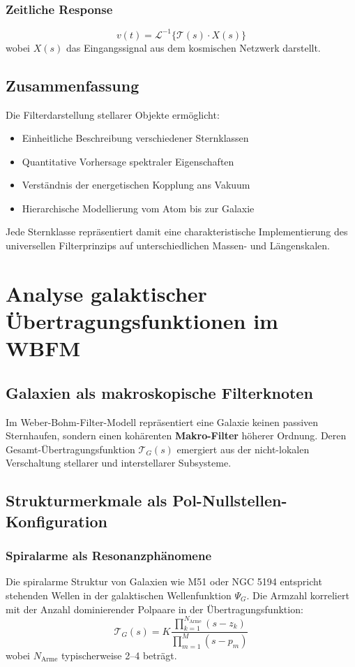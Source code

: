 \subsection{Zeitliche Response}
\[
v(t) = \mathcal{L}^{-1}\{\mathcal{T}(s)\cdot X(s)\}
\]
wobei $X(s)$ das Eingangssignal aus dem kosmischen Netzwerk darstellt.

\section{Zusammenfassung}

Die Filterdarstellung stellarer Objekte ermöglicht:
\begin{itemize}
\item Einheitliche Beschreibung verschiedener Sternklassen
\item Quantitative Vorhersage spektraler Eigenschaften
\item Verständnis der energetischen Kopplung ans Vakuum
\item Hierarchische Modellierung vom Atom bis zur Galaxie
\end{itemize}

Jede Sternklasse repräsentiert damit eine charakteristische Implementierung des universellen Filterprinzips auf unterschiedlichen Massen- und Längenskalen.

\chapter{Analyse galaktischer Übertragungsfunktionen im WBFM}

\section{Galaxien als makroskopische Filterknoten}
Im Weber-Bohm-Filter-Modell repräsentiert eine Galaxie keinen passiven Sternhaufen, sondern einen kohärenten \textbf{Makro-Filter} höherer Ordnung. Deren
Gesamt-Übertragungsfunktion $\mathcal{T}_G(s)$ emergiert aus der nicht-lokalen Verschaltung stellarer und interstellarer Subsysteme.

\section{Strukturmerkmale als Pol-Nullstellen-Konfiguration}

\subsection{Spiralarme als Resonanzphänomene}
Die spiralarme Struktur von Galaxien wie M51 oder NGC 5194 entspricht stehenden Wellen in der galaktischen Wellenfunktion $\Psi_G$. Die Armzahl korreliert mit der Anzahl
dominierender Polpaare in der Übertragungsfunktion:
\[
\mathcal{T}_G(s) = K \frac{\prod_{k=1}^{N_{\text{Arme}}}(s - z_k)}{\prod_{m=1}^{M}(s - p_m)}
\]
wobei $N_{\text{Arme}}$ typischerweise 2--4 beträgt.

